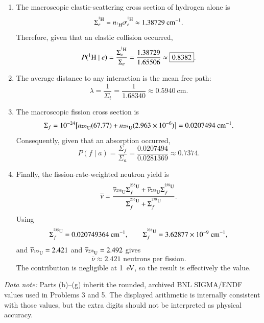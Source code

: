 \begin{draftsolution}
\begin{enumerate}[label=(\alph*)]
\item The macroscopic elastic-scattering cross section of hydrogen alone is
\[
 \Sigma_e^{\isoA{H}{1}}=n_{\isoA{H}{1}}\sigma_e^{\isoA{H}{1}}
 \approx1.38729~\mathrm{cm^{-1}}.
\]
Therefore, given that an elastic collision occurred,
\[
 P(\isoA{H}{1}\mid e)=\frac{\Sigma_e^{\isoA{H}{1}}}{\Sigma_e}
 =\frac{1.38729}{1.65506}\approx\boxed{0.8382}.
\]

\item The average distance to any interaction is the mean free path:
\[
 \lambda=\frac{1}{\Sigma_t}=\frac{1}{1.68340}
 \approx\boxed{0.5940~\mathrm{cm}}.
\]

\item The macroscopic fission cross section is
\[
\begin{split}
 \Sigma_f=10^{-24}\big[n_{\isoA{U}{235}}(67.77)
 +n_{\isoA{U}{238}}(2.963\times10^{-6})\big]
 =0.0207494~\mathrm{cm^{-1}}.
\end{split}
\]
Consequently, given that an absorption occurred,
\[
 P(f\mid a)=\frac{\Sigma_f}{\Sigma_a}
 =\frac{0.0207494}{0.0281369}\approx\boxed{0.7374}.
\]

\item Finally, the fission-rate-weighted neutron yield is
\[
 \overline\nu=
 \frac{\overline\nu_{\isoA{U}{235}}\Sigma_f^{\isoA{U}{235}}
       +\overline\nu_{\isoA{U}{238}}\Sigma_f^{\isoA{U}{238}}}
      {\Sigma_f^{\isoA{U}{235}}+\Sigma_f^{\isoA{U}{238}}}.
\]
Using
\[
 \Sigma_f^{\isoA{U}{235}}=0.020749364~\mathrm{cm^{-1}},\qquad
 \Sigma_f^{\isoA{U}{238}}=3.62877\times10^{-9}~\mathrm{cm^{-1}},
\]
and $\overline\nu_{\isoA{U}{235}}=2.421$ and
$\overline\nu_{\isoA{U}{238}}=2.492$ gives
\[
 \boxed{\overline\nu\approx2.421\text{ neutrons per fission}}.
\]
The  contribution is negligible at 1~eV, so the result is
effectively the  value.
\end{enumerate}

\noindent\emph{Data note:} Parts (b)--(g) inherit the rounded, archived BNL
SIGMA/ENDF values used in Problems 3 and 5.  The displayed arithmetic is
internally consistent with those values, but the extra digits should not be
interpreted as physical accuracy.
\end{draftsolution}

\clearpage
